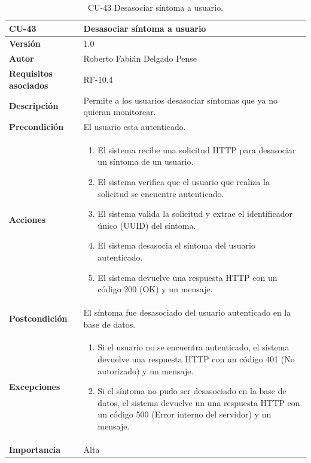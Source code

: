 \begin{table}[p]
	\centering
	\begin{tabularx}{\linewidth}{ p{} p{} }
		\toprule
		\textbf{CU-43}    & \textbf{Desasociar síntoma a usuario}\\
		\toprule
		\textbf{Versión}              & 1.0    \\
		\textbf{Autor}                & Roberto Fabián Delgado Pense \\
		\textbf{Requisitos asociados} & RF-10.4 \\ 
		\textbf{Descripción}          & Permite a los usuarios desasociar síntomas  que ya no quieran monitorear.\\
		\textbf{Precondición}         & El usuario esta autenticado. \\  
		\textbf{Acciones}             &
		\begin{enumerate}
			\def\labelenumi{\arabic{enumi}.}
			\tightlist
			\item El sistema recibe una solicitud HTTP para desasociar un síntoma de un usuario.
                \item El sistema verifica que el usuario que realiza la solicitud se encuentre autenticado.
                \item El sistema valida la solicitud y extrae el identificador único (UUID) del síntoma.
                \item El sistema desasocia el síntoma del usuario autenticado.
                \item El sistema devuelve una respuesta HTTP con un código 200 (OK) y un mensaje.         
            \end{enumerate}\\
		\textbf{Postcondición}        & El síntoma fue desasociado del usuario autenticado en la base de datos.\\
		\textbf{Excepciones}          & 
              \begin{enumerate}
			\def\labelenumi{\arabic{enumi}.}
			\tightlist
   			\item Si el usuario no se encuentra autenticado, el sistema devuelve una respuesta HTTP con un código 401 (No autorizado) y un mensaje.
                \item   Si el síntoma no pudo ser desasociado en la base de datos, el sistema devuelve un                           una respuesta HTTP con un código 500 (Error interno del servidor) y un mensaje. 
            \end{enumerate}\\
		\textbf{Importancia}          & Alta \\
		\bottomrule
	\end{tabularx}
	\caption{CU-43 Desasociar síntoma a usuario.}
\end{table}
	
